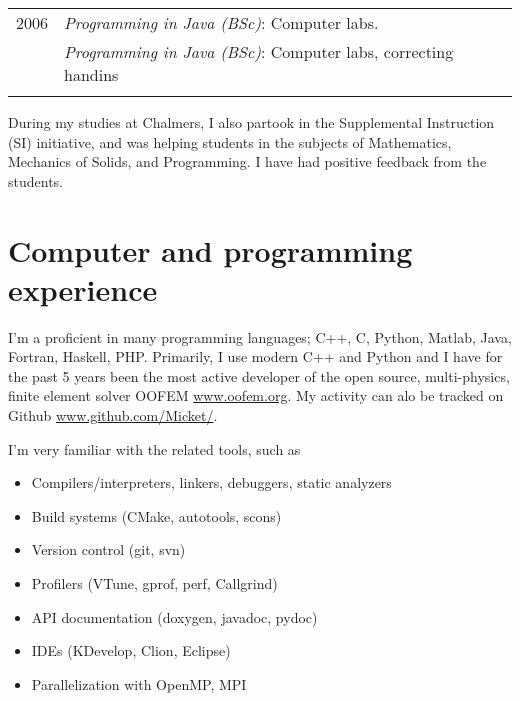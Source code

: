\documentclass[a4paper,10pt]{article} %
\begin{document}
{\begin{tabular}{r|p{11cm}}

\textsc{2006} 
              & \emph{Programming in Java (BSc)}: \footnotesize{Computer labs.}\\
              & \emph{Programming in Java (BSc)}: \footnotesize{Computer labs, correcting handins}\\
\multicolumn{2}{c}{} \\

% 

\end{tabular}

During my studies at Chalmers, I also partook in the Supplemental Instruction (SI) initiative, and was helping students in the subjects of Mathematics, Mechanics of Solids, and Programming.
I have had positive feedback from the students.



\section{Computer and programming experience}

I'm a proficient in many programming languages; C++, C, Python, Matlab, Java, Fortran, Haskell, PHP.
Primarily, I use modern C++ and Python and I have for the past 5 years been the most active developer of the open source, multi-physics, finite element solver OOFEM \url{www.oofem.org}. My activity can alo be tracked on Github \url{www.github.com/Micket/}.

I'm very familiar with the related tools, such as
\begin{itemize}
 \item Compilers/interpreters, linkers, debuggers, static analyzers
 \item Build systems (CMake, autotools, scons)
 \item Version control (git, svn)
 \item Profilers (VTune, gprof, perf, Callgrind)
 \item API documentation (doxygen, javadoc, pydoc)
 \item IDEs (KDevelop, Clion, Eclipse)
 \item Parallelization with OpenMP, MPI
\end{itemize}

}
\end{document}
